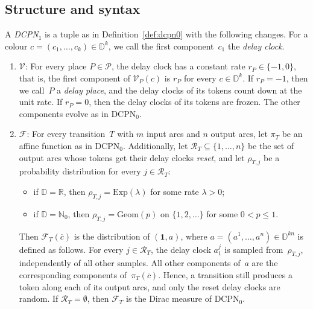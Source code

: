 \documentclass[11pt]{article}
\theoremstyle{definition}
\newcommand{\NatZero}{\mathbb{N}_0}
\newcommand{\Real}{\mathbb{R}}
\newcommand{\Dom}{\mathbb{D}}
\newcommand{\cvec}{\overline{c}}
\newcommand{\DCPN}[1]{\texorpdfstring{\textup{DCPN}\ensuremath{_{#1}}}{DCPN#1}}
\begin{document}
\subsection{Structure and syntax}

A \emph{\DCPN{1}} is a tuple as in Definition~\ref{def:dcpn0} with the
following changes. For a colour $c = (c_1, \dots, c_k) \in \Dom^k$, we call
the first component~$c_1$ the \emph{delay clock}.

\begin{enumerate}
  \item[7.] $\mathcal{V}$: For every place $P \in \mathcal{P}$, the delay
    clock has a constant rate $r_P \in \{-1, 0\}$, that is, the first
    component of $\mathcal{V}_P(c)$ is $r_P$ for every $c \in \Dom^k$. If
    $r_P = -1$, then we call~$P$ a \emph{delay place}, and the delay clocks
    of its tokens count down at the unit rate. If $r_P = 0$, then the delay
    clocks of its tokens are frozen. The other components evolve as in
    \DCPN{0}.

  \item[10.] $\mathcal{F}$: For every transition~$T$ with $m$ input arcs and
    $n$ output arcs, let $\pi_T$ be an affine function as in \DCPN{0}.
    Additionally, let $\mathcal{R}_T \subseteq \{1, \dots, n\}$ be the set
    of output arcs whose tokens get their delay clocks \emph{reset}, and let
    $\rho_{T, j}$ be a probability distribution for every $j \in
    \mathcal{R}_T$:
    \begin{itemize}
      \item if $\Dom = \Real$, then $\rho_{T, j} = \mathrm{Exp}(\lambda)$ for
        some rate $\lambda > 0$;
      \item if $\Dom = \NatZero$, then $\rho_{T, j} = \mathrm{Geom}(p)$ on
        $\{1, 2, \dots\}$ for some $0 < p \le 1$.
    \end{itemize}
    Then $\mathcal{F}_T(\cvec)$ is the distribution of $(\mathbf{1}, a)$,
    where $a = (a^1, \dots, a^n) \in \Dom^{kn}$ is defined as follows. For
    every $j \in \mathcal{R}_T$, the delay clock $a^j_1$ is sampled
    from~$\rho_{T, j}$, independently of all other samples. All other
    components of~$a$ are the corresponding components of~$\pi_T(\cvec)$.
    Hence, a transition still produces a token along each of its output arcs,
    and only the reset delay clocks are random. If
    $\mathcal{R}_T = \emptyset$, then $\mathcal{F}_T$ is the Dirac measure of
    \DCPN{0}.
\end{enumerate}
\end{document}
